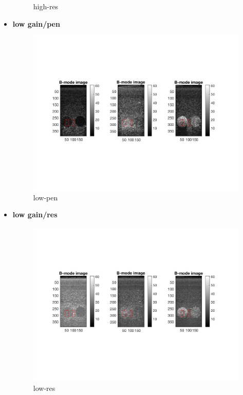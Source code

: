 \documentclass[12pts,a4paper]{article}
\begin{document}
\begin{itemize}
\begin{figure}[h]
    \caption{high-res}
    \label{fig:mesh1}
\end{figure}
\pagebreak
\item{\textbf{low gain/pen}}
\begin{center}
\end{center}
\begin{figure}[h]
    \centering
    \includegraphics[width=1.0\textwidth]{img_hw3/low_pen.jpg}
    \caption{low-pen}
    \label{fig:mesh1}
\end{figure}
\pagebreak
\item{\textbf{low gain/res}}
\begin{center}
\end{center}
\begin{figure}[h]
    \centering
    \includegraphics[width=1.0\textwidth]{img_hw3/low_res.jpg}
    \caption{low-res}
    \label{fig:mesh1}
\end{figure}
\pagebreak
\end{itemize}
\end{document}
